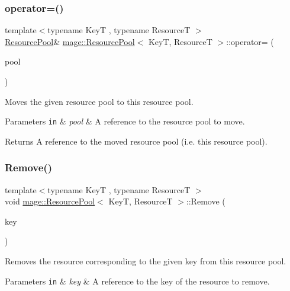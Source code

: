 \subsubsection{\texorpdfstring{operator=()}{operator=()}\hspace{0.1cm}{\footnotesize\ttfamily [2/2]}}
{\footnotesize\ttfamily template$<$typename KeyT , typename ResourceT $>$ \\
\hyperlink{classmage_1_1_resource_pool}{Resource\+Pool}\& \hyperlink{classmage_1_1_resource_pool}{mage\+::\+Resource\+Pool}$<$ KeyT, ResourceT $>$\+::operator= (\begin{DoxyParamCaption}\item[{\hyperlink{classmage_1_1_resource_pool}{Resource\+Pool}$<$ KeyT, ResourceT $>$ \&\&}]{pool }\end{DoxyParamCaption})\hspace{0.3cm}{\ttfamily [delete]}}

Moves the given resource pool to this resource pool.


\begin{DoxyParams}[1]{Parameters}
\mbox{\tt in}  & {\em pool} & A reference to the resource pool to move. \\
\hline
\end{DoxyParams}
\begin{DoxyReturn}{Returns}
A reference to the moved resource pool (i.\+e. this resource pool). 
\end{DoxyReturn}
\hypertarget{classmage_1_1_resource_pool_a58801a2c21f973e18b84277ddaa60d74}{}\label{classmage_1_1_resource_pool_a58801a2c21f973e18b84277ddaa60d74} 
\subsubsection{\texorpdfstring{Remove()}{Remove()}}
{\footnotesize\ttfamily template$<$typename KeyT , typename ResourceT $>$ \\
void \hyperlink{classmage_1_1_resource_pool}{mage\+::\+Resource\+Pool}$<$ KeyT, ResourceT $>$\+::Remove (\begin{DoxyParamCaption}\item[{const KeyT \&}]{key }\end{DoxyParamCaption})}

Removes the resource corresponding to the given key from this resource pool.


\begin{DoxyParams}[1]{Parameters}
\mbox{\tt in}  & {\em key} & A reference to the key of the resource to remove. \\
\hline
\end{DoxyParams}
\hypertarget{classmage_1_1_resource_pool_a23cac3f3462c375973ee15a5b87d6284}{}\label{classmage_1_1_resource_pool_a23cac3f3462c375973ee15a5b87d6284} 
